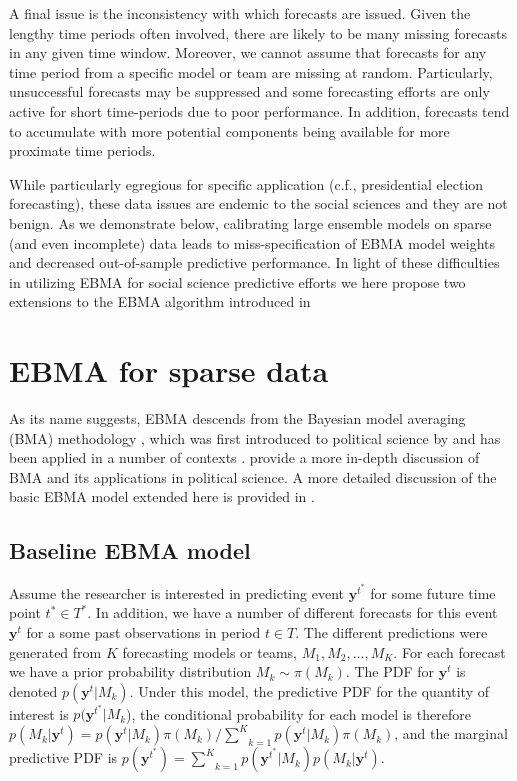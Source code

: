 \documentclass[12pt,fullpage,endnotes]{article}
\begin{document}
A final issue is the inconsistency with which forecasts are
issued. Given the lengthy time periods often involved, there are
likely to be many missing forecasts in any given time window.
Moreover, we cannot assume that forecasts for any time period from a
specific model or team are missing at random.  Particularly,
unsuccessful forecasts may be suppressed and some forecasting efforts
are only active for short time-periods due to poor performance.
In addition, forecasts tend to accumulate with more potential
components being available for more proximate time periods.

While particularly egregious for specific application (c.f.,
presidential election forecasting), these data issues are endemic to
the social sciences and they are not benign. As we
demonstrate below, calibrating large ensemble models on sparse (and
even incomplete) data leads to miss-specification of EBMA model
weights and decreased out-of-sample predictive performance. In light of these difficulties in utilizing EBMA for social science predictive efforts we here propose two extensions to the EBMA algorithm introduced in  

\section{EBMA for sparse data} 
\label{model}


As its name suggests, EBMA descends from the Bayesian model averaging
(BMA) methodology \citep[c.f.,][]{Madigan:1994, Raftery:1995,
  Hoeting:1999, Clyde:2003, Clyde:2004}, which was first introduced to
political science by \citet{Bartels:1997} and has been applied in a
number of contexts \citep[e.g.,][]{Bartels:2001, Gill:2004,
  Imai:2004}. 
provide a more in-depth discussion of BMA and its applications in
political science.  A more detailed discussion of the basic EBMA model
extended here is provided in .

\subsection{Baseline EBMA model}

Assume the researcher is interested in predicting event $\mathbf{y}^{t^*}$ for some future time point $t^\ast \in T^\ast$. In addition, we have a number of different forecasts for this event $\mathbf{y}^t$ for a some past observations in period $t \in T$. The different predictions were generated from $K$ forecasting models or teams, $M_1, M_2, \ldots, M_K$. For each forecast we have a prior
probability distribution $M_k\sim \pi(M_k)$. The PDF for
$\mathbf{y}^t$ is denoted $p(\mathbf{y}^t|M_k)$. Under this model,
the predictive PDF for the quantity of interest is
$p(\mathbf{y}^{t^*}|M_k$), the conditional probability for each model
is therefore $p(M_k|\mathbf{y}^t) =
p(\mathbf{y}^t|M_k)\pi(M_k)/\underset{k=1}{\overset{K}{\sum}}p(\mathbf{y}^t|M_k)\pi(M_k)$,
and the marginal predictive PDF is $p(\mathbf{y}^{t^*}) =
\underset{k=1}{\overset{K}{\sum}}
p(\mathbf{y}^{t^*}|M_k)p(M_k|\mathbf{y}^{t})$.
\end{document}
